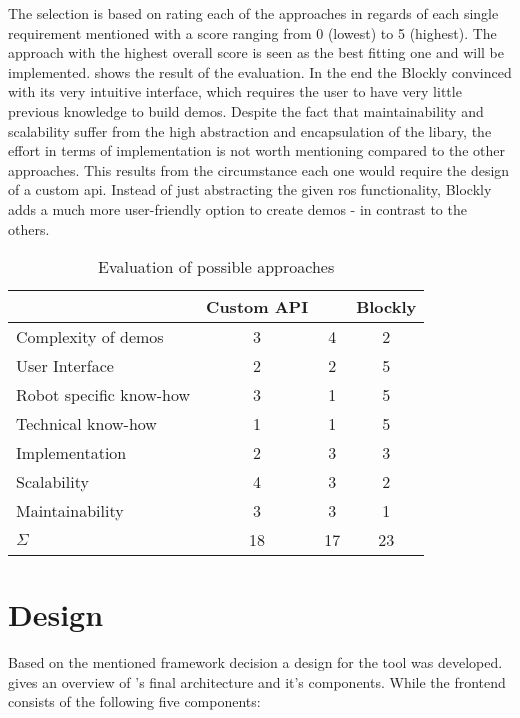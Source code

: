 The selection is based on rating each of the approaches in regards of each single requirement mentioned with a score ranging from 0 (lowest) to 5 (highest). The approach with the highest overall score is seen as the best fitting one and will be implemented.  shows the result of the evaluation. In the end the Blockly convinced with its very intuitive interface, which requires the user to have very little previous knowledge to build demos. Despite the fact that maintainability and scalability suffer from the high abstraction and encapsulation of the libary, the effort in terms of implementation is not worth mentioning compared to the other approaches. This results from the circumstance each one would require the design of a custom \gls{api}. Instead of just abstracting the given \gls{ros} functionality, Blockly adds a much more user-friendly option to create demos - in contrast to the others.

\begin{table}[htbp]
	\centering
	\begin{tabular}{l c c c}
		\toprule
		                        & Custom API & \smach{} & Blockly \\
		\midrule
		Complexity of demos     & 3          & 4        & 2       \\
		User Interface          & 2          & 2        & 5       \\
		Robot specific know-how & 3          & 1        & 5       \\
		Technical know-how      & 1          & 1        & 5       \\
		Implementation          & 2          & 3        & 3       \\
		Scalability             & 4          & 3        & 2       \\
		Maintainability         & 3          & 3        & 1       \\
		\bottomrule
		$\Sigma$                & 18         & 17       & 23      \\
		\bottomrule
	\end{tabular}
	\caption{Evaluation of possible approaches}
	\label{tab:decision}
\end{table}

\section{Design} \label{sec:ArchitectureOverview}
Based on the mentioned framework decision a design for the tool was developed.  gives an overview of \toolname{}'s final architecture and it's components. While the frontend consists of the following five components:

